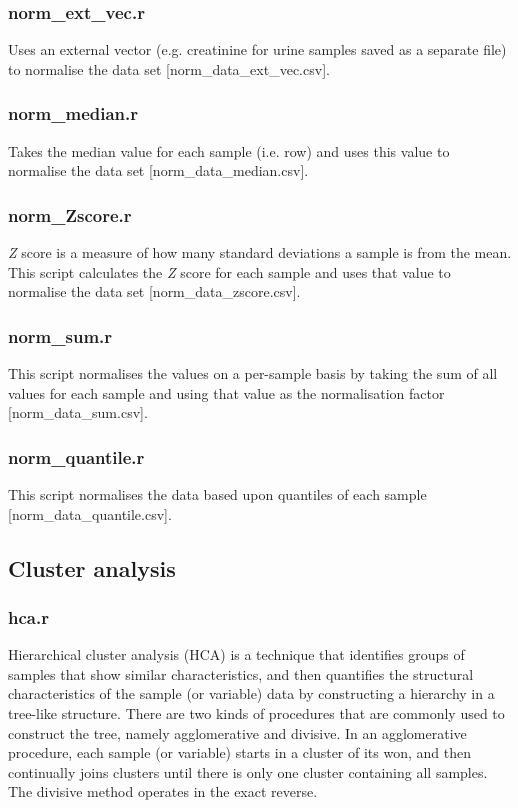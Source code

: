 \documentclass[english,a4paper,12pt]{article}
\begin{document}
\subsubsection*{norm\_ext\_vec.r}
Uses an external vector (e.g. creatinine for urine samples saved as a separate file) to normalise the data set [\textsf{norm\_data\_ext\_vec.csv}].

\subsubsection*{norm\_median.r}
Takes the median value for each sample (i.e. row) and uses this value to normalise the data set [\textsf{norm\_data\_median.csv}].

\subsubsection*{norm\_Zscore.r}
\emph{Z} score is a measure of how many standard deviations a sample is from the mean. This script calculates the \emph{Z} score for each sample and uses that value to normalise the data set [\textsf{norm\_data\_zscore.csv}].

\subsubsection*{norm\_sum.r}
This script normalises the values on a per-sample basis by taking the sum of all values for each sample and using that value as the normalisation factor [\textsf{norm\_data\_sum.csv}].

\subsubsection*{norm\_quantile.r}
This script normalises the data based upon quantiles of each sample [\textsf{norm\_data\_quantile.csv}].

\subsection*{Cluster analysis}

\subsubsection*{hca.r}
Hierarchical cluster analysis (HCA) is a technique that identifies groups of samples that show similar characteristics, and then quantifies the structural characteristics of the sample (or variable) data by constructing a hierarchy in a tree-like structure. There are two kinds of procedures that are commonly used to construct the tree, namely agglomerative and divisive. In an agglomerative procedure, each sample (or variable) starts in a cluster of its won, and then continually joins clusters until there is only one cluster containing all samples. The divisive method operates in the exact reverse.
\end{document}
